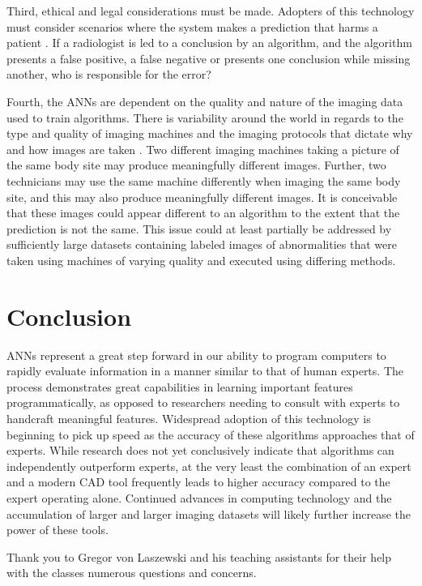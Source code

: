 \documentclass[sigconf]{acmart}
\begin{document}
Third, ethical and legal considerations must be made. Adopters of this technology must consider scenarios where the system makes a prediction that harms a patient \cite{cite05}. If a radiologist is led to a conclusion by an algorithm, and the algorithm presents a false positive, a false negative or presents one conclusion while missing another, who is responsible for the error?

Fourth, the ANNs are dependent on the quality and nature of the imaging data used to train algorithms. There is variability around the world in regards to the type and quality of imaging machines and the imaging protocols that dictate why and how images are taken \cite{cite05}. Two different imaging machines taking a picture of the same body site may produce meaningfully different images. Further, two technicians may use the same machine differently when imaging the same body site, and this may also produce meaningfully different images. It is conceivable that these images could appear different to an algorithm to the extent that the prediction is not the same. This issue could at least partially be addressed by sufficiently large datasets containing labeled images of abnormalities that were taken using machines of varying quality and executed using differing methods.

\section{Conclusion}

ANNs represent a great step forward in our ability to program computers to rapidly evaluate information in a manner similar to that of human experts. The process demonstrates great capabilities in learning important features programmatically, as opposed to researchers needing to consult with experts to handcraft meaningful features. Widespread adoption of this technology is beginning to pick up speed as the accuracy of these algorithms approaches that of experts. While research does not yet conclusively indicate that algorithms can independently outperform experts, at the very least the combination of an expert and a modern CAD tool frequently leads to higher accuracy compared to the expert operating alone. Continued advances in computing technology and the accumulation of larger and larger imaging datasets will likely further increase the power of these tools.

\begin{acks}

Thank you to Gregor von Laszewski and his teaching assistants for their help with the classes numerous questions and concerns.
  
\end{acks}


 

\appendix
 

\end{document}
